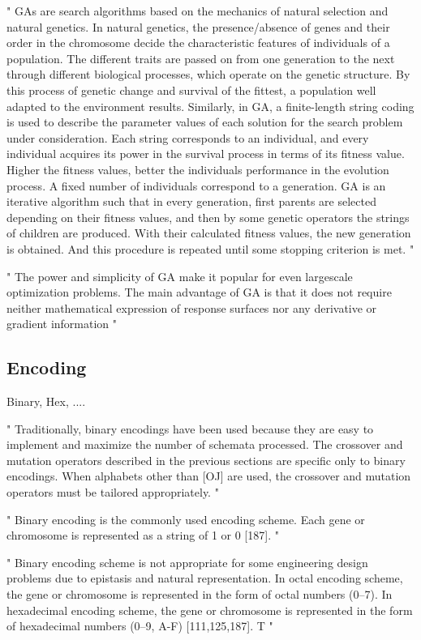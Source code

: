"
GAs are search algorithms based on the mechanics of natural selection and natural genetics. In natural genetics, the presence/absence of genes and their order in the chromosome decide the characteristic features of individuals of a population. The different traits are passed on from one generation to the next through different biological processes, which operate on the genetic structure. By this process of genetic change and survival of the fittest, a population well adapted to the environment results. Similarly, in GA, a finite-length string coding is used to describe the parameter values of each solution for the search problem under consideration. Each string corresponds to an individual, and every individual acquires its power in the survival process in terms of its fitness value. Higher the fitness values, better the individuals performance in the evolution process. A fixed number of individuals correspond to a generation. GA is an iterative algorithm such that in every generation, first parents are selected depending on their fitness values, and then by some genetic operators the strings of children are produced. With their calculated fitness values, the new generation is obtained. And this procedure is repeated until some stopping criterion is met.
"\cite{boyabatli_parameter_2004}

"
The power and simplicity of GA make it popular for even largescale optimization problems. The main advantage of GA is that it does not require neither mathematical expression of response surfaces nor any derivative or gradient information
"\cite{boyabatli_parameter_2004}
\subsection{Encoding}
\label{chap:foundation:ga:encoding}
Binary, Hex, ....

"
Traditionally, binary encodings have been used because they are easy to implement and maximize the number of schemata processed. The crossover and mutation operators described in the previous sections are specific only to binary encodings. When alphabets other than [OJ] are used, the crossover and mutation operators must be tailored appropriately.
"\cite{srinivas_genetic_1994}

"
Binary encoding is the commonly used encoding scheme. Each gene or chromosome is represented as a string of 1 or 0 [187].
"\cite{katoch_review_2021}

"
Binary encoding scheme is not appropriate for some engineering design problems due to epistasis and natural representation. In octal encoding scheme, the gene or chromosome is represented in the form of octal numbers (0–7). In hexadecimal encoding scheme, the gene or chromosome is represented in the form of hexadecimal numbers (0–9, A-F) [111,125,187]. T
"\cite{katoch_review_2021}

